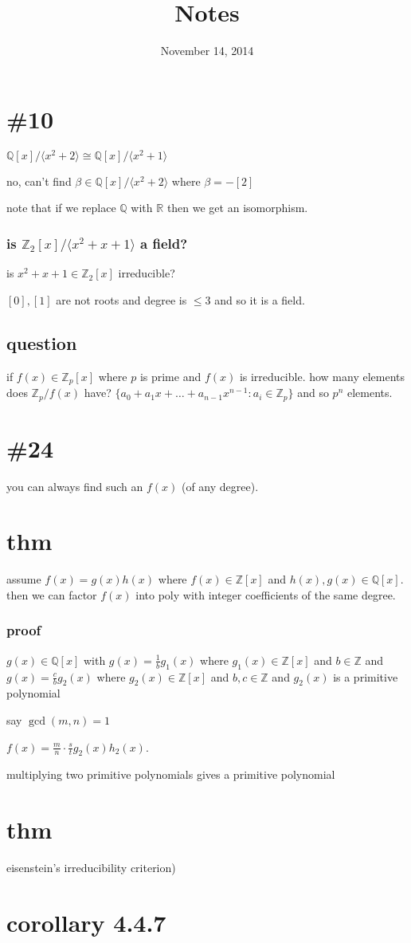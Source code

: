 \documentclass[letterpaper]{article}
\begin{document}
\title{Notes}
\date{November 14, 2014}
\maketitle
\section*{\#10}
$\mathbb{Q}[x]/\langle x^2+2\rangle\cong \mathbb{Q}[x]/\langle x^2+1\rangle$ 

no, can't find $\beta\in\mathbb{Q}[x]/\langle x^2+2\rangle$ where $\beta=-[2]$

note that if we replace $\mathbb{Q}$ with $\mathbb{R}$ then we get an isomorphism.

\subsubsection*{is $\mathbb{Z}_2[x]/\langle x^2+x+1\rangle$ a field?} is $x^2+x+1\in \mathbb{Z}_2[x]$ irreducible?

$[0],[1]$ are not roots and degree is $\le3$ and so it is a field.
\subsection*{question}
if $f(x)\in \mathbb{Z}_p[x]$ where $p$ is prime and $f(x)$ is irreducible. how many elements does $\mathbb{Z}_p/f(x)$ have? $\{a_0+a_1x+\dots+a_{n-1}x^{n-1}:a_i\in\mathbb{Z}_p\}$  and so $p^n$ elements.

\section*{\#24}
you can always find such an $f(x)$ (of any degree).

\section*{thm}
assume $f(x)=g(x)h(x)$ where $f(x)\in \mathbb{Z}[x]$ and $h(x),g(x)\in\mathbb{Q}[x]$. then we can factor $f(x)$ into poly with integer coefficients of the same degree.
\subsubsection*{proof}
$g(x)\in\mathbb{Q}[x]$ with $g(x)=\frac{1}{b}g_1(x)$ where $g_1(x)\in\mathbb{Z}[x]$ and $b\in\mathbb{Z}$ and $g(x)=\frac{c}{b}g_2(x)$ where $g_2(x)\in\mathbb{Z}[x]$ and $b,c\in\mathbb{Z}$ and $g_2(x)$ is a primitive polynomial

say $\gcd(m,n)=1$

$f(x)=\frac{m}{n}\cdot\frac{s}{t}g_2(x)h_2(x)$.

multiplying two primitive polynomials gives a primitive polynomial

\section*{thm}
eisenstein's irreducibility criterion)

\section*{corollary 4.4.7}
\end{document}
